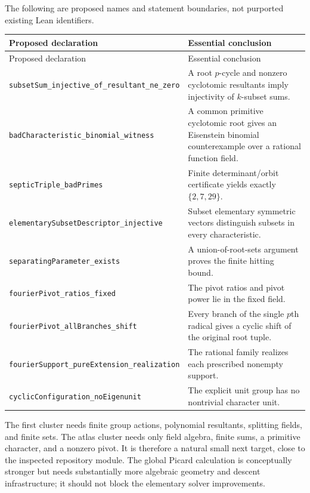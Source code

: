 \documentclass[11pt,a4paper]{article}
\theoremstyle{definition}
\theoremstyle{remark}
\newcommand{\code}[1]{{\small\nolinkurl{#1}}}
\begin{document}
The following are proposed names and statement boundaries, not purported
existing Lean identifiers.
\begin{center}
\small
\begin{longtable}{@{}L{0.40\textwidth}L{0.54\textwidth}@{}}
\toprule
Proposed declaration & Essential conclusion\\
\midrule\endfirsthead
\toprule Proposed declaration & Essential conclusion\\\midrule\endhead
\code{subsetSum_injective_of_resultant_ne_zero} &
A root $p$-cycle and nonzero cyclotomic resultants imply injectivity of
$k$-subset sums.\\
\code{badCharacteristic_binomial_witness} &
A common primitive cyclotomic root gives an Eisenstein binomial
counterexample over a rational function field.\\
\code{septicTriple_badPrimes} &
Finite determinant/orbit certificate yields exactly $\{2,7,29\}$.\\
\code{elementarySubsetDescriptor_injective} &
Subset elementary symmetric vectors distinguish subsets in every
characteristic.\\
\code{separatingParameter_exists} &
A union-of-root-sets argument proves the finite hitting bound.\\
\code{fourierPivot_ratios_fixed} &
The pivot ratios and pivot power lie in the fixed field.\\
\code{fourierPivot_allBranches_shift} &
Every branch of the single $p$th radical gives a cyclic shift of the
original root tuple.\\
\code{fourierSupport_pureExtension_realization} &
The rational family realizes each prescribed nonempty support.\\
\code{cyclicConfiguration_noEigenunit} &
The explicit unit group has no nontrivial character unit.\\
\bottomrule
\end{longtable}
\end{center}

The first cluster needs finite group actions, polynomial resultants,
splitting fields, and finite sets. The atlas cluster needs only field
algebra, finite sums, a primitive character, and a nonzero pivot. It is
therefore a natural small next target, close to the inspected repository
module. The global Picard calculation is conceptually stronger but needs
substantially more algebraic geometry and descent infrastructure; it should
not block the elementary solver improvements.
\end{document}

